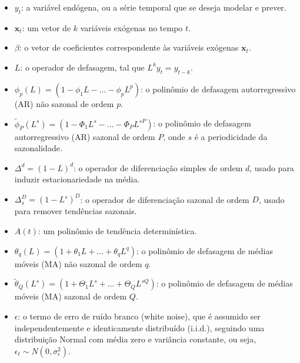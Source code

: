 \documentclass[ 12pt,a4paper ]{article} %
\begin{document}
	\begin{itemize}
		\item $y_t$: a variável endógena, ou a série temporal que se deseja modelar e prever.
		
		\item $\mathbf{x}_t$: um vetor de $k$ variáveis exógenas no tempo $t$. 
		
		\item $\beta$: o vetor de coeficientes correspondente às variáveis exógenas $\mathbf{x}_t$.
		
		\item $L$: o operador de defasagem, tal que $L^k y_t = y_{t-k}$.
		
		\item $\phi_p(L) = (1 - \phi_1 L - \dots - \phi_p L^p)$: o polinômio de defasagem autorregressivo (AR) não sazonal de ordem $p$.
		
		\item $\tilde{\phi}_P(L^s) = (1 - \Phi_1 L^s - \dots - \Phi_P L^{sP})$: o polinômio de defasagem autorregressivo (AR) sazonal de ordem $P$, onde $s$ é a periodicidade da sazonalidade.
		
		\item $\Delta^d = (1-L)^d$: o operador de diferenciação simples de ordem $d$, usado para induzir estacionariedade na média.
		
		\item $\Delta_s^D = (1-L^s)^D$: o operador de diferenciação sazonal de ordem $D$, usado para remover tendências sazonais.
		
		\item $A(t)$: um polinômio de tendência determinística.
		
		\item $\theta_q(L) = (1 + \theta_1 L + \dots + \theta_q L^q)$: o polinômio de defasagem de médias móveis (MA) não sazonal de ordem $q$.
		
		\item $\tilde{\theta}_Q(L^s) = (1 + \Theta_1 L^s + \dots + \Theta_Q L^{sQ})$: o polinômio de defasagem de médias móveis (MA) sazonal de ordem $Q$.
		
		\item $\epsilon$: o termo de erro de ruído branco (white noise), que é assumido ser independentemente e identicamente distribuído (i.i.d.), seguindo uma distribuição Normal com média zero e variância constante, ou seja, $\epsilon_t \sim N(0, \sigma^2_\epsilon)$.
		\end{itemize}
		
\end{document}
